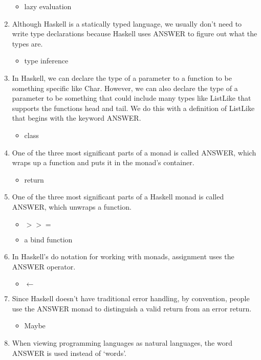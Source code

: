 \documentclass{exam}
\begin{document}
\begin{enumerate}
\begin{itemize}
\item lazy evaluation
\end{itemize}
\item Although Haskell is a statically typed language, we usually don't need to write type declarations because Haskell uses ANSWER to figure out what the types are.
\begin{itemize}
\item type inference
\end{itemize}
\item In Haskell, we can declare the type of a parameter to a function to be something specific like Char.  However, we can also declare the type of a parameter to be something that could include many types like ListLike that supports the functions head and tail.  We do this with a definition of ListLike that begins with the keyword ANSWER.
\begin{itemize}
\item class
\end{itemize}
\item One of the three most significant parts of a monad is called ANSWER, which wraps up a function and puts it in the monad's container.
\begin{itemize}
\item return
\end{itemize}
\item One of the three most significant parts of a Haskell monad is called ANSWER, which unwraps a function.
\begin{itemize}
\item $>>=$
\item a bind function
\end{itemize}
\item In Haskell's do notation for working with monads, assignment uses the ANSWER operator.
\begin{itemize}
\item $\leftarrow$
\end{itemize}
\item Since Haskell doesn't have traditional error handling, by convention, people use the ANSWER monad to distinguish a valid return from an error return.
\begin{itemize}
\item Maybe
\end{itemize}
\item When viewing programming languages as natural languages, the word ANSWER is used instead of `words'.

\end{enumerate}
\end{document}
